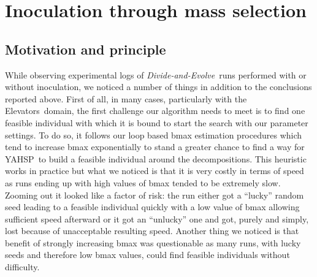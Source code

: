 \documentclass[english]{DESCARWINreport}
\newcommand{\dae}{{\em Divide-and-Evolve}}
\newcommand{\YAHSP}{{\sc YAHSP}}
\newcommand{\ELEVATORS}{{\sc Elevators}}
\begin{document}
\newpage









\chapter{Inoculation through mass selection}

\section{Motivation and principle}

While observing experimental logs of \dae\ runs performed with or without inoculation, we noticed a number of things in addition to the conclusions reported above. First of all, in many cases, particularly with the \ELEVATORS\ domain, the first challenge our algorithm needs to meet is to find one feasible individual with which it is bound to start the search with our parameter settings. To do so, it follows our loop based bmax estimation procedures which tend to increase bmax exponentially to stand a greater chance to find a way for \YAHSP\ to build a feasible individual around the decompositions. This heuristic works in practice but what we noticed is that it is very costly in terms of speed as runs ending up with high values of bmax tended to be extremely slow. Zooming out it looked like a factor of risk: the run either got a ``lucky'' random seed leading to a feasible individual quickly with a low value of bmax allowing sufficient speed afterward or it got an ``unlucky'' one and got, purely and simply, lost because of unacceptable resulting speed. Another thing we noticed is that benefit of strongly increasing bmax was questionable as many runs, with lucky seeds and therefore low bmax values, could find feasible individuals without difficulty.
\end{document}
